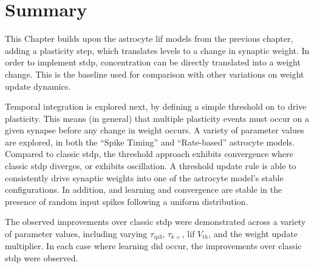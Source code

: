 
\section{Summary}

This Chapter builds upon the astrocyte \gls{lif} models from the previous chapter,
adding a plasticity step, which translates \ca levels to a change
in synaptic weight. In order to implement \gls{stdp}, \ca concentration can be directly
translated into a weight change. This is the baseline used for comparison with
other variations on weight update dynamics.

Temporal integration is explored next, by defining a simple threshold on
\ca to drive plasticity. This means (in general) that multiple plasticity events
must occur on a given synapse before any change in weight occurs. A variety of
parameter values are explored, in both the ``Spike Timing'' and ``Rate-based''
astrocyte models. Compared to classic \gls{stdp}, the threshold approach exhibits
convergence where classic \gls{stdp} diverges, or exhibits oscillation. A threshold
update rule is able to consistently drive synaptic weights into one of the
astrocyte model's stable configurations. In addition, and learning and
convergence are stable in the presence of random input spikes following a
uniform distribution.

The observed improvements over classic \gls{stdp} were demonstrated across a variety
of parameter values, including varying $\tau_{ip3}$, $\tau_{k+}$, \gls{lif} $V_{th}$,
and the weight update multiplier. In each case where learning did occur, the
improvements over classic \gls{stdp} were observed.

